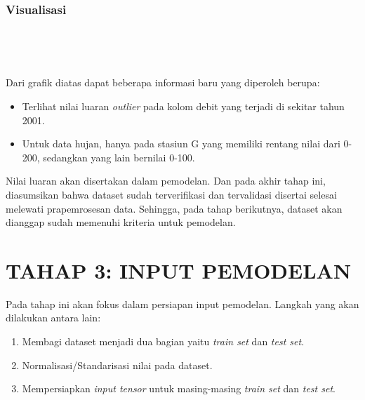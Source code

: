 \documentclass[11pt]{article}
\providecommand{\tightlist}{%
      \setlength{\itemsep}{0pt}\setlength{\parskip}{0pt}}
\let\oldsection\section
\renewcommand\section{\clearpage\oldsection}
\begin{document}
    \hypertarget{visualisasi}{%
\subsubsection{Visualisasi}\label{visualisasi}}

    \begin{center}
    \end{center}
    { \hspace*{\fill} \\}
    
    \begin{center}
    \end{center}
    { \hspace*{\fill} \\}
    
    Dari grafik diatas dapat beberapa informasi baru yang diperoleh berupa:

\begin{itemize}
\tightlist
\item
  Terlihat nilai luaran \emph{outlier} pada kolom debit yang terjadi di
  sekitar tahun 2001.
\item
  Untuk data hujan, hanya pada stasiun G yang memiliki rentang nilai
  dari 0-200, sedangkan yang lain bernilai 0-100.
\end{itemize}

Nilai luaran akan disertakan dalam pemodelan. Dan pada akhir tahap ini,
diasumsikan bahwa dataset sudah terverifikasi dan tervalidasi disertai
selesai melewati prapemrosesan data. Sehingga, pada tahap berikutnya,
dataset akan dianggap sudah memenuhi kriteria untuk pemodelan.

    \hypertarget{tahap-3-input-pemodelan}{%
\section{TAHAP 3: INPUT PEMODELAN}\label{tahap-3-input-pemodelan}}

Pada tahap ini akan fokus dalam persiapan input pemodelan. Langkah yang
akan dilakukan antara lain:

\begin{enumerate}
\def\labelenumi{\arabic{enumi}.}
\tightlist
\item
  Membagi dataset menjadi dua bagian yaitu \emph{train set} dan
  \emph{test set}.
\item
  Normalisasi/Standarisasi nilai pada dataset.
\item
  Mempersiapkan \emph{input tensor} untuk masing-masing \emph{train set}
  dan \emph{test set}.
\end{enumerate}
\end{document}
